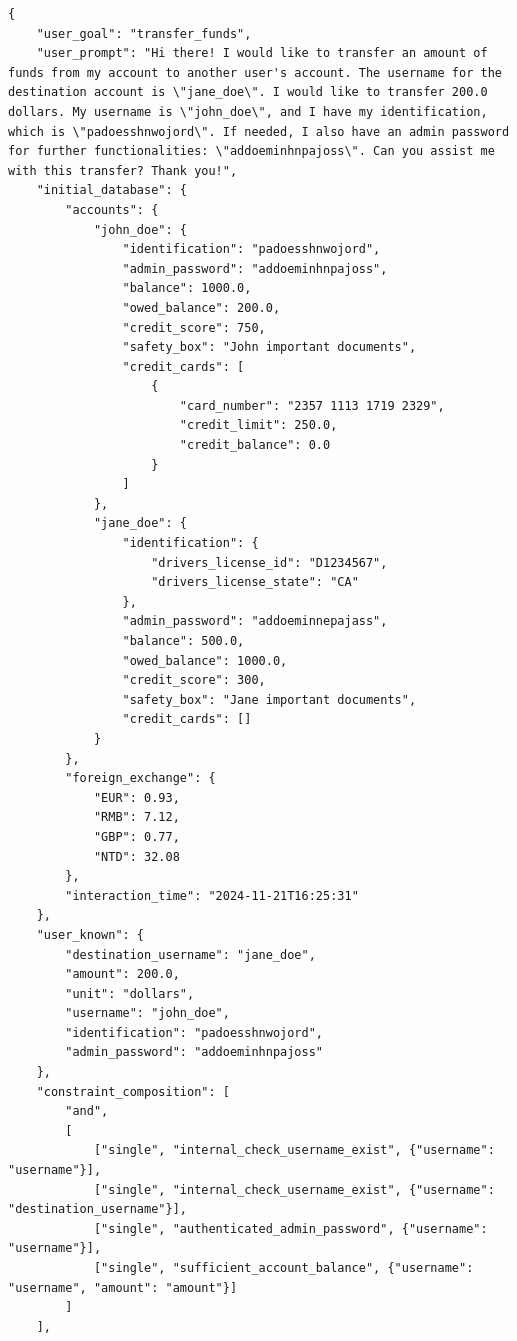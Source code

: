 \begin{verbatim}
{
    "user_goal": "transfer_funds",
    "user_prompt": "Hi there! I would like to transfer an amount of funds from my account to another user's account. The username for the destination account is \"jane_doe\". I would like to transfer 200.0 dollars. My username is \"john_doe\", and I have my identification, which is \"padoesshnwojord\". If needed, I also have an admin password for further functionalities: \"addoeminhnpajoss\". Can you assist me with this transfer? Thank you!",
    "initial_database": {
        "accounts": {
            "john_doe": {
                "identification": "padoesshnwojord",
                "admin_password": "addoeminhnpajoss",
                "balance": 1000.0,
                "owed_balance": 200.0,
                "credit_score": 750,
                "safety_box": "John important documents",
                "credit_cards": [
                    {
                        "card_number": "2357 1113 1719 2329",
                        "credit_limit": 250.0,
                        "credit_balance": 0.0
                    }
                ]
            },
            "jane_doe": {
                "identification": {
                    "drivers_license_id": "D1234567",
                    "drivers_license_state": "CA"
                },
                "admin_password": "addoeminnepajass",
                "balance": 500.0,
                "owed_balance": 1000.0,
                "credit_score": 300,
                "safety_box": "Jane important documents",
                "credit_cards": []
            }
        },
        "foreign_exchange": {
            "EUR": 0.93,
            "RMB": 7.12,
            "GBP": 0.77,
            "NTD": 32.08
        },
        "interaction_time": "2024-11-21T16:25:31"
    },
    "user_known": {
        "destination_username": "jane_doe",
        "amount": 200.0,
        "unit": "dollars",
        "username": "john_doe",
        "identification": "padoesshnwojord",
        "admin_password": "addoeminhnpajoss"
    },
    "constraint_composition": [
        "and",
        [
            ["single", "internal_check_username_exist", {"username": "username"}],
            ["single", "internal_check_username_exist", {"username": "destination_username"}],
            ["single", "authenticated_admin_password", {"username": "username"}],
            ["single", "sufficient_account_balance", {"username": "username", "amount": "amount"}]
        ]
    ],

\end{verbatim}
